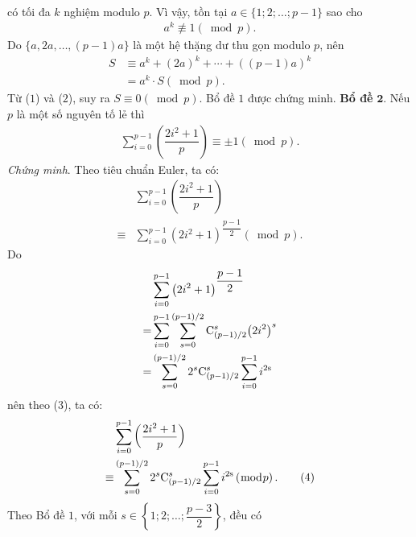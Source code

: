 \begin{multicols}{2}
\begin{align*}
	\end{align*}
	có tối đa $k$ nghiệm modulo $p$. Vì vậy, tồn tại $a \in \{1; 2; \ldots; p - 1\}$ sao cho
	\begin{align*}
		{a^k}\not  \equiv 1\left( {\bmod p} \right). \tag{$1$}
	\end{align*}
	Do $\{a, 2a, \ldots, (p - 1)a\}$ là một hệ thặng dư thu gọn modulo $p$, nên
	\begin{align*}
		S &\equiv {a^k} + {\left( {2a} \right)^k} +  \cdots  + {\left( {\left( {p - 1} \right)a} \right)^k} \\[-0.5ex]
		&= {a^k} \cdot S\left( {\bmod p} \right). \tag{$2$}
	\end{align*}
	Từ ($1$) và ($2$), suy ra $S \equiv 0\left( {\bmod p} \right)$.
	\vskip 0.05cm 
	Bổ đề $1$ được chứng minh.
	\vskip 0.05cm
	\textbf{\color{thachthuctoanhoc}Bổ đề} $\pmb{2.}$ Nếu $p$ là một số nguyên tố lẻ thì
	\begin{align*}
		\sum\limits_{i = 0}^{p - 1} {\left( {\dfrac{{2{i^2} + 1}}{p}} \right)}  \equiv  \pm 1\left( {\bmod p} \right).
	\end{align*}
	\textit{Chứng minh}. Theo tiêu chuẩn Euler, ta có:
	\begin{align*}
		&\sum\limits_{i = 0}^{p - 1} {\left( {\dfrac{{2{i^2} + 1}}{p}} \right)} \\
		\equiv &\sum\limits_{i = 0}^{p - 1} {{{\left( {2{i^2} + 1} \right)}^{\dfrac{{p - 1}}{2}}}} \left( {\bmod p} \right). \tag{$3$}	
	\end{align*}
	Do
	\begin{align*}
		&\sum\limits_{i = 0}^{p - 1} {{{\left( {2{i^2} + 1} \right)}^{\dfrac{{p - 1}}{2}}}}  \\
		= &\sum\limits_{i = 0}^{p - 1} {\sum\limits_{s = 0}^{\left( {p - 1} \right)/2} {{\rm{C}}_{\left( {p - 1} \right)/2}^s{{\left( {2{i^2}} \right)}^s}} }  \\
		= &\sum\limits_{s = 0}^{\left( {p - 1} \right)/2} {{2^s}{\rm{C}}_{\left( {p - 1} \right)/2}^s\sum\limits_{i = 0}^{p - 1} {{i^{2{\rm{s}}}}} }
	\end{align*}
	nên theo ($3$), ta có:
	\begin{align*}
		&\sum\limits_{i = 0}^{p - 1} {\left( {\dfrac{{2{i^2} + 1}}{p}} \right)} \\ \equiv &\sum\limits_{s = 0}^{\left( {p - 1} \right)/2} {{2^s}{\rm{C}}_{\left( {p - 1} \right)/2}^s\sum\limits_{i = 0}^{p - 1} {{i^{2{\rm{s}}}}} } \left( {\bmod p} \right). \tag{$4$}
	\end{align*}
	Theo Bổ đề $1$, với mỗi $s \in \left\{ {1;2; \ldots ;\dfrac{{p - 3}}{2}} \right\}$,  đều có

\end{multicols}
